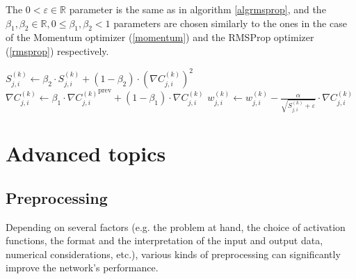 \documentclass[titlepage]{article}
\begin{document}
        The $0 < \varepsilon \in \mathbb{R}$ parameter is the same as in
        algorithm \ref{algrmsprop}, and the
        $\beta_1, \beta_2 \in \mathbb{R}, 0 \leq \beta_1, \beta_2 <1$ parameters
        are chosen similarly to the ones in the case of the Momentum optimizer
        (\ref{momentum}) and the RMSProp optimizer (\ref{rmsprop}) respectively.

        \begin{algorithm}
          \caption{%
            Modified version of algorithm \ref{algadjustweights} with Adam
            optimizer.
          } \label{algadam}
          \begin{algorithmic}
                    \State $
                      S_{j,i}^{(k)} \gets
                        \beta_2 \cdot S_{j,i}^{(k)}
                        + \left( 1 - \beta_2 \right)
                        \cdot \left( \nabla C_{j,i}^{(k)} \right)^2
                    $ 
                    \State $
                      \nabla C_{j,i}^{(k)} \gets
                        \beta_1 \cdot {\nabla C_{j,i}^{(k)}}^\text{prev}
                        +
                        \left( 1 - \beta_1 \right) \cdot \nabla C_{j,i}^{(k)}
                    $ 
                    \State $
                      w_{j,i}^{(k)} \gets
                        w_{j,i}^{(k)}
                        - \frac{\alpha}{\sqrt{S_{j,i}^{(k)} + \varepsilon}}
                        \cdot \nabla C_{j,i}^{(k)}
                    $
                  \EndFor
                \EndFor
              \EndFor
            \EndProcedure
          \end{algorithmic}
        \end{algorithm}

\newpage

  \section{Advanced topics}

    \subsection{Preprocessing}

      Depending on several factors (e.g. the problem at hand, the choice of
      activation functions, the format and the interpretation of the input and
      output data, numerical considerations, etc.), various kinds of
      preprocessing can significantly improve the network's performance.
\end{document}
